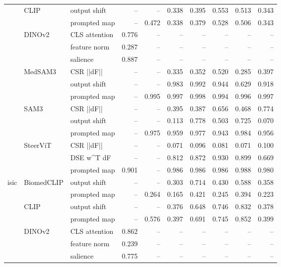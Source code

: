 \begin{tabular}{lllrrrrrrr}
\cline{2-10}
 & \multirow[t]{2}{*}{CLIP} & output shift & -- & -- & 0.338 & 0.395 & 0.553 & 0.513 & 0.343 \\
 &  & prompted map & -- & 0.472 & 0.338 & 0.379 & 0.528 & 0.506 & 0.343 \\
\cline{2-10}
 & \multirow[t]{3}{*}{DINOv2} & CLS attention & 0.776 & -- & -- & -- & -- & -- & -- \\
 &  & feature norm & 0.287 & -- & -- & -- & -- & -- & -- \\
 &  & salience & 0.887 & -- & -- & -- & -- & -- & -- \\
\cline{2-10}
 & \multirow[t]{3}{*}{MedSAM3} & CSR  ||dF|| & -- & -- & 0.335 & 0.352 & 0.520 & 0.285 & 0.397 \\
 &  & output shift & -- & -- & 0.983 & 0.992 & 0.944 & 0.629 & 0.918 \\
 &  & prompted map & -- & 0.995 & 0.997 & 0.998 & 0.994 & 0.996 & 0.997 \\
\cline{2-10}
 & \multirow[t]{3}{*}{SAM3} & CSR  ||dF|| & -- & -- & 0.395 & 0.387 & 0.656 & 0.468 & 0.774 \\
 &  & output shift & -- & -- & 0.113 & 0.778 & 0.503 & 0.725 & 0.070 \\
 &  & prompted map & -- & 0.975 & 0.959 & 0.977 & 0.943 & 0.984 & 0.956 \\
\cline{2-10}
 & \multirow[t]{3}{*}{SteerViT} & CSR  ||dF|| & -- & -- & 0.071 & 0.096 & 0.081 & 0.071 & 0.100 \\
 &  & DSE  w^T dF & -- & -- & 0.812 & 0.872 & 0.930 & 0.899 & 0.669 \\
 &  & prompted map & 0.901 & -- & 0.986 & 0.986 & 0.986 & 0.988 & 0.980 \\
\cline{1-10} \cline{2-10}
\multirow[t]{16}{*}{isic} & \multirow[t]{2}{*}{BiomedCLIP} & output shift & -- & -- & 0.303 & 0.714 & 0.430 & 0.588 & 0.358 \\
 &  & prompted map & -- & 0.264 & 0.165 & 0.421 & 0.245 & 0.394 & 0.223 \\
\cline{2-10}
 & \multirow[t]{2}{*}{CLIP} & output shift & -- & -- & 0.376 & 0.648 & 0.746 & 0.832 & 0.378 \\
 &  & prompted map & -- & 0.576 & 0.397 & 0.691 & 0.745 & 0.852 & 0.399 \\
\cline{2-10}
 & \multirow[t]{3}{*}{DINOv2} & CLS attention & 0.862 & -- & -- & -- & -- & -- & -- \\
 &  & feature norm & 0.239 & -- & -- & -- & -- & -- & -- \\
 &  & salience & 0.775 & -- & -- & -- & -- & -- & -- \\

\end{tabular}

